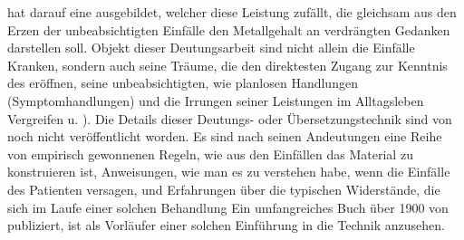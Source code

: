 \documentclass[twoside=true,titlepage=false,open=any, parskip=never, fontsize=10pt, headings=small, chapterprefix=false, appendixprefix=false]{scrbook}
\begin{document}
            
        \pstart
         hat darauf eine 
                ausgebildet, welcher
               diese Leistung zufällt, die gleichsam aus den Erzen der unbeabsichtigten Einfälle den Metallgehalt an verdrängten Gedanken darstellen soll.
               Objekt dieser Deutungsarbeit sind nicht allein die Einfälle  Kranken, sondern auch seine Träume, die den direktesten Zugang zur Kenntnis des 
               eröffnen, seine
               unbeabsichtigten, wie planlosen Handlungen (Symptomhandlungen) und die Irrungen
               seiner Leistungen im Alltagsleben 
               Vergreifen u. ). Die Details dieser Deutungs- oder Übersetzungstechnik sind
               von  noch nicht veröffentlicht
                     worden. Es sind nach seinen Andeutungen eine Reihe von
               empirisch gewonnenen Regeln, wie aus den Einfällen das  Material zu konstruieren ist, Anweisungen, wie man es zu verstehen
               habe, wenn die Einfälle des Patienten versagen, und Erfahrungen über die  typischen Widerstände, die sich im Laufe einer solchen Behandlung  Ein umfangreiches Buch über 1900 von  publiziert, ist als
               Vorläufer einer solchen Einführung in die Technik anzusehen.
        \pend
    
\end{document}
